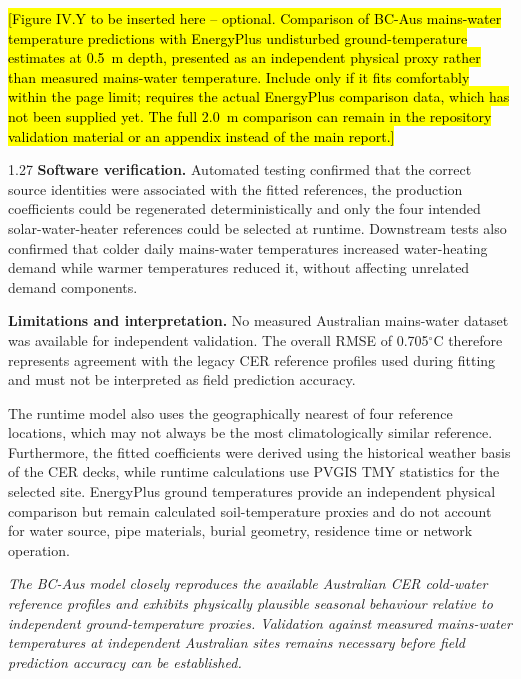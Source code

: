 \documentclass[12pt,letterpaper]{article}
\newcommand{\placeholder}[1]{\hl{#1}}
\begin{document}
\placeholder{[Figure IV.Y to be inserted here -- optional. Comparison of BC-Aus mains-water temperature predictions with EnergyPlus undisturbed ground-temperature estimates at 0.5~m depth, presented as an independent physical proxy rather than measured mains-water temperature. Include only if it fits comfortably within the page limit; requires the actual EnergyPlus comparison data, which has not been supplied yet. The full 2.0~m comparison can remain in the repository validation material or an appendix instead of the main report.]}

\begin{spacing}{1.27}
\textbf{Software verification.} Automated testing confirmed that the correct source identities were associated with the fitted references, the production coefficients could be regenerated deterministically and only the four intended solar-water-heater references could be selected at runtime. Downstream tests also confirmed that colder daily mains-water temperatures increased water-heating demand while warmer temperatures reduced it, without affecting unrelated demand components.\par

\vspace{0.15in}

\textbf{Limitations and interpretation.} No measured Australian mains-water dataset was available for independent validation. The overall RMSE of 0.705$^\circ$C therefore represents agreement with the legacy CER reference profiles used during fitting and must not be interpreted as field prediction accuracy.\par

\vspace{0.15in}

The runtime model also uses the geographically nearest of four reference locations, which may not always be the most climatologically similar reference. Furthermore, the fitted coefficients were derived using the historical weather basis of the CER decks, while runtime calculations use PVGIS TMY statistics for the selected site. EnergyPlus ground temperatures provide an independent physical comparison but remain calculated soil-temperature proxies and do not account for water source, pipe materials, burial geometry, residence time or network operation.\par

\vspace{0.15in}

\textit{The BC-Aus model closely reproduces the available Australian CER cold-water reference profiles and exhibits physically plausible seasonal behaviour relative to independent ground-temperature proxies. Validation against measured mains-water temperatures at independent Australian sites remains necessary before field prediction accuracy can be established.}
\end{spacing}
\end{document}
